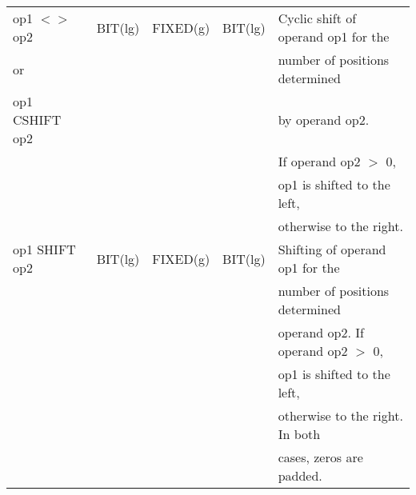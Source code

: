 \begin{table}
\begin{center}
\begin{tabular}{|l|l|l|l|l|}
op1 $<>$ op2     & BIT(lg)         & FIXED(g)        & BIT(lg)           & Cyclic shift of operand op1 for the\\
or               &                 &                 &                   & number of positions determined\\
op1 CSHIFT op2   &                 &                 &                   & by operand op2.\\
                 &                 &                 &                   & If operand op2 $>$ 0,\\
                 &                 &                 &                   & op1 is shifted to the left,\\
                 &                 &                 &                   & otherwise to the right.\\ \hline

op1 SHIFT op2    & BIT(lg)         & FIXED(g)        & BIT(lg)           & Shifting of operand op1 for the\\
                 &                 &                 &                   & number of positions determined\\
                 &                 &                 &                   & operand op2. If operand op2 $>$ 0,\\
                 &                 &                 &                   & op1 is shifted to the left,\\
                 &                 &                 &                   & otherwise to the right. In both\\
                 &                 &                 &                   & cases, zeros are padded.\\ 
\hline
\end{tabular}
\end{center}
\end{table}

